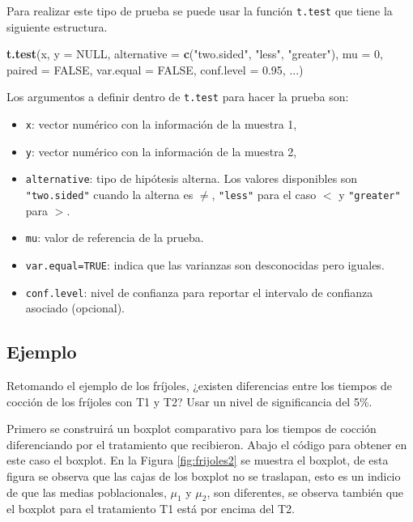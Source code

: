 \documentclass[10pt,]{krantz}
\makeatletter
\newenvironment{Shaded}{\begin{snugshade}}{\end{snugshade}}
\newcommand{\KeywordTok}[1]{\textcolor[rgb]{0.13,0.29,0.53}{\textbf{#1}}}
\newcommand{\DataTypeTok}[1]{\textcolor[rgb]{0.13,0.29,0.53}{#1}}
\newcommand{\DecValTok}[1]{\textcolor[rgb]{0.00,0.00,0.81}{#1}}
\newcommand{\FloatTok}[1]{\textcolor[rgb]{0.00,0.00,0.81}{#1}}
\newcommand{\StringTok}[1]{\textcolor[rgb]{0.31,0.60,0.02}{#1}}
\newcommand{\OtherTok}[1]{\textcolor[rgb]{0.56,0.35,0.01}{#1}}
\newcommand{\NormalTok}[1]{#1}
\providecommand{\tightlist}{%
  \setlength{\itemsep}{0pt}\setlength{\parskip}{0pt}}
\newenvironment{kframe}{%
\medskip{}
\setlength{\fboxsep}{.8em}
 \def\at@end@of@kframe{}%
 \ifinner\ifhmode%
  \def\at@end@of@kframe{\end{minipage}}%
  \begin{minipage}{\columnwidth}%
 \fi\fi%
 \def\FrameCommand##1{\hskip\@totalleftmargin \hskip-\fboxsep
 \colorbox{shadecolor}{##1}\hskip-\fboxsep
     \hskip-\linewidth \hskip-\@totalleftmargin \hskip\columnwidth}%
 \MakeFramed {\advance\hsize-\width
   \@totalleftmargin\z@ \linewidth\hsize
   \@setminipage}}%
 {\par\unskip\endMakeFramed%
 \at@end@of@kframe}
\renewenvironment{Shaded}{\begin{kframe}}{\end{kframe}}
\makeatother
\begin{document}
Para realizar este tipo de prueba se puede usar la función
\texttt{t.test} que tiene la siguiente estructura.

\begin{Shaded}
\begin{Highlighting}[]
\KeywordTok{t.test}\NormalTok{(x, }\DataTypeTok{y =} \OtherTok{NULL}\NormalTok{,}
       \DataTypeTok{alternative =} \KeywordTok{c}\NormalTok{(}\StringTok{"two.sided"}\NormalTok{, }\StringTok{"less"}\NormalTok{, }\StringTok{"greater"}\NormalTok{),}
       \DataTypeTok{mu =} \DecValTok{0}\NormalTok{, }\DataTypeTok{paired =} \OtherTok{FALSE}\NormalTok{, }\DataTypeTok{var.equal =} \OtherTok{FALSE}\NormalTok{,}
       \DataTypeTok{conf.level =} \FloatTok{0.95}\NormalTok{, ...)}
\end{Highlighting}
\end{Shaded}

Los argumentos a definir dentro de \texttt{t.test} para hacer la prueba
son:

\begin{itemize}
\tightlist
\item
  \texttt{x}: vector numérico con la información de la muestra 1,
\item
  \texttt{y}: vector numérico con la información de la muestra 2,
\item
  \texttt{alternative}: tipo de hipótesis alterna. Los valores
  disponibles son \texttt{"two.sided"} cuando la alterna es \(\neq\),
  \texttt{"less"} para el caso \(<\) y \texttt{"greater"} para \(>\).
\item
  \texttt{mu}: valor de referencia de la prueba.
\item
  \texttt{var.equal=TRUE}: indica que las varianzas son desconocidas
  pero iguales.
\item
  \texttt{conf.level}: nivel de confianza para reportar el intervalo de
  confianza asociado (opcional).
\end{itemize}

\subsection*{Ejemplo}\label{ejemplo-71}


Retomando el ejemplo de los fríjoles, ¿existen diferencias entre los
tiempos de cocción de los fríjoles con T1 y T2? Usar un nivel de
significancia del 5\%.

Primero se construirá un boxplot comparativo para los tiempos de cocción
diferenciando por el tratamiento que recibieron. Abajo el código para
obtener en este caso el boxplot. En la Figura \ref{fig:frijoles2} se
muestra el boxplot, de esta figura se observa que las cajas de los
boxplot no se traslapan, esto es un indicio de que las medias
poblacionales, \(\mu_1\) y \(\mu_2\), son diferentes, se observa también
que el boxplot para el tratamiento T1 está por encima del T2.
\end{document}
